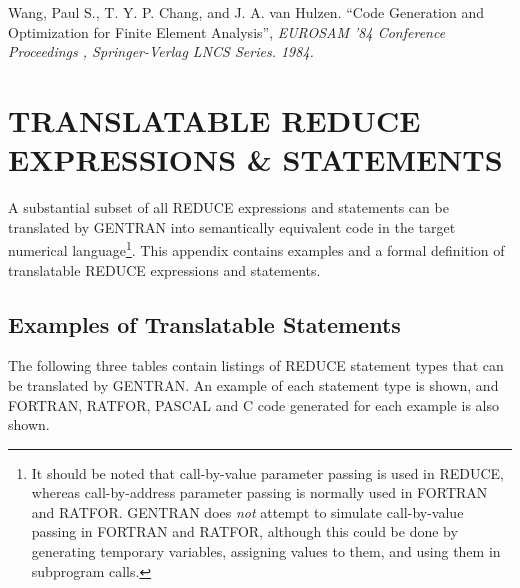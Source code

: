 Wang, Paul S., T. Y. P. Chang, and J. A. van Hulzen.  ``Code Generation
and Optimization for Finite Element Analysis'', 
\it EUROSAM '84 Conference
Proceedings
\rm , Springer-Verlag LNCS Series.  1984.

\appendix
\chapter{TRANSLATABLE REDUCE EXPRESSIONS \& STATEMENTS}

A substantial subset of all REDUCE expressions and statements
can be translated by GENTRAN into semantically equivalent code
in the target numerical language\footnote{
It should be noted that call-by-value parameter passing is used
in REDUCE, whereas call-by-address parameter passing is normally
used in FORTRAN and RATFOR.  GENTRAN does {\it not} attempt
to simulate call-by-value passing in FORTRAN and RATFOR, although
this could be done by generating temporary variables, assigning
values to them, and using them in subprogram calls.}. This
appendix contains examples and a formal definition of translatable REDUCE
expressions and statements.

\section{ Examples of Translatable Statements}
The following three tables contain listings of REDUCE statement types
that can be translated by GENTRAN.  An example of each statement
type is shown, and FORTRAN, RATFOR, PASCAL and C code generated for each
example is also shown.

